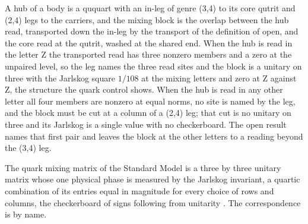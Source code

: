 A hub of a body is a ququart with an in-leg of genre (3,4) to its core qutrit and (2,4) legs to the carriers, and the mixing block is the overlap between the hub read, transported down the in-leg by the transport of the definition of open, and the core read at the qutrit, washed at the shared end. When the hub is read in the letter Z the transported read has three nonzero members and a zero at the unpaired level, so the leg names the three read sites and the block is a unitary on three with the Jarlskog square $1/108$ at the mixing letters and zero at Z against Z, the structure the quark control shows. When the hub is read in any other letter all four members are nonzero at equal norms, no site is named by the leg, and the block must be cut at a column of a (2,4) leg; that cut is no unitary on three and its Jarlskog is a single value with no checkerboard. The open result names that first pair and leaves the block at the other letters to a reading beyond the (3,4) leg.
\begin{chbridge}
The quark mixing matrix of the Standard Model is a three by three unitary matrix whose one physical phase is measured by the Jarlskog invariant, a quartic combination of its entries equal in magnitude for every choice of rows and columns, the checkerboard of signs following from unitarity \cite{Cabibbo1963,Jarlskog1985}. The correspondence is by name.
\end{chbridge}
